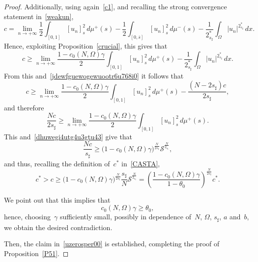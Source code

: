\documentclass[10pt,a4paper]{amsart}
\renewcommand{\ge}{\geqslant}
\newcommand{\half}{\frac{1}{2}}
\begin{document}
\begin{proof}
Additionally, using again~\eqref{c1}, and recalling the strong convergence
statement in~\eqref{weakun},
\begin{equation*}c=
\lim_{n\to+\infty}\half  \int_{[{{ 0 }}, 1]} [u_n]^2_{s}\, d\mu^+ (s)
-\half\int_{[{{ 0 }}, \overline s]} [u_n]^2_s \, d\mu^-(s)- \frac{1}{2_{s_\sharp}^*} \int_\Omega |u_n|^{2_{s_\sharp}^*}\, dx.
\end{equation*}
Hence, exploiting Proposition~\ref{crucial}, this gives that
\begin{equation*}c\ge
\lim_{n\to+\infty}\frac{1-c_0(N,\Omega)\gamma}2
\int_{[{{ 0 }}, 1]} [u_n]^2_{s}\, d\mu^+ (s)
- \frac{1}{2_{s_\sharp}^*} \int_\Omega |u_n|^{2_{s_\sharp}^*}\, dx.
\end{equation*}
{F}rom this and~\eqref{jdewfguewogewuootr6u768i0} it follows that
\begin{equation*}c\ge
\lim_{n\to+\infty}\frac{1-c_0(N,\Omega)\gamma}2
\int_{[{{ 0 }}, 1]} [u_n]^2_{s}\, d\mu^+ (s)
- \frac{(N-2s_\sharp)c}{2{s_\sharp}},
\end{equation*}
and therefore
\begin{equation*}\frac{Nc}{2s_\sharp}\ge
\lim_{n\to+\infty}\frac{1-c_0(N,\Omega)\gamma}2
\int_{[{{ 0 }}, 1]} [u_n]^2_{s}\, d\mu^+ (s).
\end{equation*}
This and~\eqref{dhuwegi4utg4u3gtu43} give that
\begin{equation*}\frac{Nc}{s_\sharp}\ge
\big(1-c_0(N,\Omega)\gamma\big)^{\frac{N}{2s_\sharp}}
\mathcal{S}^{\frac{N}{2_{s_\sharp}}},
\end{equation*}
and thus, recalling the definition of~$c^\ast$ in~\eqref{CASTA},
\begin{equation*}c^\ast>c\ge
\big(1-c_0(N,\Omega)\gamma\big)^{\frac{N}{2s_\sharp}}\frac{s_\sharp}{N}
\mathcal{S}^{\frac{N}{2_{s_\sharp}}}
=\left(\frac{1-c_0(N,\Omega)\gamma}{1-\theta_0}\right)^{\frac{N}{2s_\sharp}} c^\ast.
\end{equation*}

We point out that this implies that
$$ c_0(N,\Omega)\gamma\ge \theta_0,$$
hence, choosing~$\gamma$ sufficiently small, possibly in dependence of~$N$, $\Omega$, $s_\sharp$, $a$ and~$b$,
we obtain the desired contradiction.

Then, the claim in~\eqref{uzerosper00} is established, completing the
proof of Proposition~\ref{P51}.
\end{proof}
\end{document}
